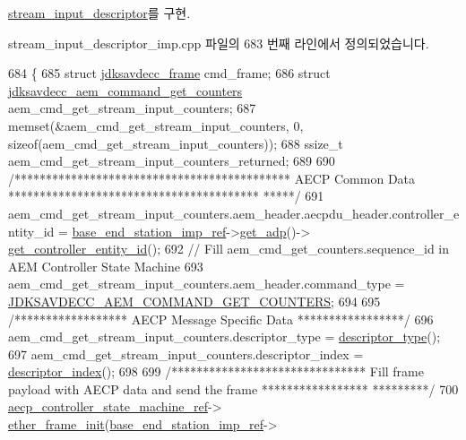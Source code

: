 \hyperlink{classavdecc__lib_1_1stream__input__descriptor_ab657b0af297908406798934243812b7c}{stream\+\_\+input\+\_\+descriptor}를 구현.



stream\+\_\+input\+\_\+descriptor\+\_\+imp.\+cpp 파일의 683 번째 라인에서 정의되었습니다.


\begin{DoxyCode}
684 \{
685     \textcolor{keyword}{struct }\hyperlink{structjdksavdecc__frame}{jdksavdecc\_frame} cmd\_frame;
686     \textcolor{keyword}{struct }\hyperlink{structjdksavdecc__aem__command__get__counters}{jdksavdecc\_aem\_command\_get\_counters} 
      aem\_cmd\_get\_stream\_input\_counters;
687     memset(&aem\_cmd\_get\_stream\_input\_counters, 0, \textcolor{keyword}{sizeof}(aem\_cmd\_get\_stream\_input\_counters));
688     ssize\_t aem\_cmd\_get\_stream\_input\_counters\_returned;
689 
690     \textcolor{comment}{/******************************************** AECP Common Data ****************************************
      *****/}
691     aem\_cmd\_get\_stream\_input\_counters.aem\_header.aecpdu\_header.controller\_entity\_id = 
      \hyperlink{classavdecc__lib_1_1descriptor__base__imp_a550c969411f5f3b69f55cc139763d224}{base\_end\_station\_imp\_ref}->\hyperlink{classavdecc__lib_1_1end__station__imp_a471a74540ce6182fad0c17dfd010107e}{get\_adp}()->
      \hyperlink{classavdecc__lib_1_1adp_a0c0959a46658c0a22e9530334b2912da}{get\_controller\_entity\_id}();
692     \textcolor{comment}{// Fill aem\_cmd\_get\_counters.sequence\_id in AEM Controller State Machine}
693     aem\_cmd\_get\_stream\_input\_counters.aem\_header.command\_type = 
      \hyperlink{group__command_ga1cce6a5b14c1a00d2491799265ebfeb6}{JDKSAVDECC\_AEM\_COMMAND\_GET\_COUNTERS};
694 
695     \textcolor{comment}{/****************** AECP Message Specific Data *****************/}
696     aem\_cmd\_get\_stream\_input\_counters.descriptor\_type = \hyperlink{classavdecc__lib_1_1descriptor__base__imp_aefc543029ab093823c3f5b9d84f0ccc4}{descriptor\_type}();
697     aem\_cmd\_get\_stream\_input\_counters.descriptor\_index = \hyperlink{classavdecc__lib_1_1descriptor__base__imp_ac23c0a35276c07cfce8c8660700c2135}{descriptor\_index}();
698 
699     \textcolor{comment}{/******************************* Fill frame payload with AECP data and send the frame *****************
      *********/}
700     \hyperlink{namespaceavdecc__lib_a0b1b5aea3c0490f77cbfd9178af5be22}{aecp\_controller\_state\_machine\_ref}->
      \hyperlink{classavdecc__lib_1_1aecp__controller__state__machine_a86ff947c5e6b799cfb877d3767bfa1f9}{ether\_frame\_init}(\hyperlink{classavdecc__lib_1_1descriptor__base__imp_a550c969411f5f3b69f55cc139763d224}{base\_end\_station\_imp\_ref}->

\end{DoxyCode}
